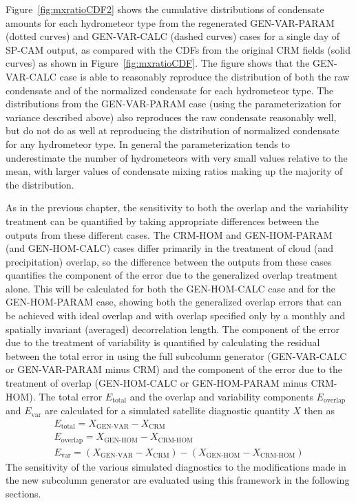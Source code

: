 Figure~\ref{fig:mxratioCDF2} shows the cumulative distributions of
condensate amounts for each hydrometeor type from the regenerated
GEN-VAR-PARAM (dotted curves) and GEN-VAR-CALC (dashed curves) cases for
a single day of SP-CAM output, as compared with the CDFs from the
original CRM fields (solid curves) as shown in
Figure~\ref{fig:mxratioCDF}. The figure shows that the GEN-VAR-CALC case
is able to reasonably reproduce the distribution of both the raw
condensate and of the normalized condensate for each hydrometeor type.
The distributions from the GEN-VAR-PARAM case (using the
parameterization for variance described above) also reproduces the raw
condensate reasonably well, but do not do as well at reproducing the
distribution of normalized condensate for any hydrometeor type. In
general the parameterization tends to underestimate the number of
hydrometeors with very small values relative to the mean, with larger
values of condensate mixing ratios making up the majority of the
distribution.

As in the previous chapter, the sensitivity to both the overlap and the
variability treatment can be quantified by taking appropriate
differences between the outputs from these different cases. The CRM-HOM
and GEN-HOM-PARAM (and GEN-HOM-CALC) cases differ primarily in the
treatment of cloud (and precipitation) overlap, so the difference
between the outputs from these cases quantifies the component of the
error due to the generalized overlap treatment alone. This will be
calculated for both the GEN-HOM-CALC case and for the GEN-HOM-PARAM
case, showing both the generalized overlap errors that can be achieved
with ideal overlap and with overlap specified only by a monthly and
spatially invariant (averaged) decorrelation length. The component of
the error due to the treatment of variability is quantified by
calculating the residual between the total error in using the full
subcolumn generator (GEN-VAR-CALC or GEN-VAR-PARAM minus CRM) and the
component of the error due to the treatment of overlap (GEN-HOM-CALC or
GEN-HOM-PARAM minus CRM-HOM). The total error \(E_\textrm{total}\) and
the overlap and variability components \(E_\textrm{overlap}\) and
\(E_\textrm{var}\) are calculated for a simulated satellite diagnostic
quantity \(X\) then as \[\begin{gathered} 
    E_\textrm{total} = X_\textrm{GEN-VAR} - X_\textrm{CRM} \\ 
    E_\textrm{overlap} = X_\textrm{GEN-HOM} - X_\textrm{CRM-HOM} \\ 
    E_\textrm{var} = (X_\textrm{GEN-VAR} - X_\textrm{CRM}) 
        - (X_\textrm{GEN-HOM} - X_\textrm{CRM-HOM})
\end{gathered}\] The sensitivity of the various simulated diagnostics to
the modifications made in the new subcolumn generator are evaluated
using this framework in the following sections.

